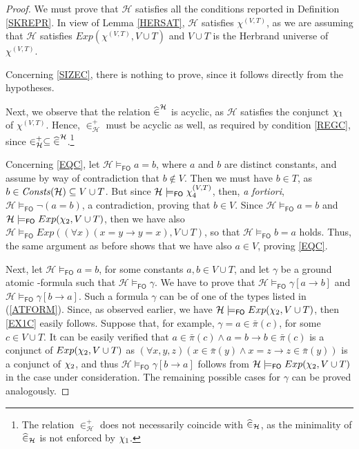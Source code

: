 \documentclass[a4paper]{llncs}
\newcommand{\HExp}{Exp}
\newcommand{\memclosure}[1]{\in_{#1}^{+}}
\newcommand{\nonpairin}[2]{#1 \in \bar{\pi}(#2)}
\newcommand{\seteq}[2]{#1=#2}
\newcommand{\consta}{a}
\newcommand{\constb}{b}
\newcommand{\constc}{c}
\newcommand{\subst}[3]{#1[#2\rightarrow#3]}
\newcommand{\hinter}{\ensuremath{\mathcal{H}}}
\newcommand{\fomodels}[2]{#1 \models_{\mathsf{FO}} #2}
\begin{document}
\begin{proof}
We must prove that $\hinter$ satisfies all the conditions
reported in Definition \ref{SKREPR}.
In view of Lemma
\ref{HERSAT},
$\hinter$ satisfies $\chi^{(V,T)}$, as we are assuming that
$\hinter$ satisfies $\HExp(\chi^{(V,T)}, V \cup T)$ and $V \cup T$ is
the Herbrand universe of $\chi^{(V,T)}$.

Concerning \ref{SIZEC}, there is nothing to prove, since it follows 
directly from the hypotheses.

Next, we observe that the relation $\memhatP^{\hinter}$ is acyclic,
as $\hinter$ satisfies the conjunct $\chi_1$ of $\chi^{(V,T)}$.
Hence, $\memclosure{\hinter}$ must be acyclic as well, as required by
condition \ref{REGC}, since $\memclosure{\hinter} \subseteq
\memhatP^{\hinter}$.\footnote{The relation $\memclosure{\hinter}$ does
not necessarily coincide with $\memhatP_{\hinter}$, as the minimality
of $\memhatP_{\hinter}$ is not enforced by $\chi_1$.}

Concerning \ref{EQC}, let 
$\fomodels{\hinter}{\seteq{\consta}{\constb}}$, where $a$ and $b$ are 
distinct constants, and assume by
way of contradiction that $\constb \notin V$. Then we must have 
$\constb \in T$, as $b \in \Consts(\hinter) \subseteq V \cup T$.
But since $\fomodels{\hinter}{\eqf}$, then, \emph{a fortiori}, 
$\fomodels{\hinter}{\neg(\seteq{\consta}{\constb})}$, a contradiction,
proving that $\constb \in V$. Since 
$\fomodels{\hinter}{\seteq{\consta}{\constb}}$ and 
$\fomodels{\hinter}{\HExp(\exonef, V \cup T)}$,
then we have also $\fomodels{\hinter}{\HExp((\forall x)(\seteq{x}{y} 
\rightarrow \seteq{y}{x}), V \cup T)}$, so
that $\fomodels{\hinter}{\seteq{\constb}{\consta}}$ holds. Thus, the 
same argument as before shows that we have also
$\consta \in V$, proving \ref{EQC}.

Next, let $\fomodels{\hinter}{\seteq{\consta}{\constb}}$, for some
constants
$\consta, \constb \in V \cup T$, and let $\gamma$ be a ground
atomic \Forallpizero-formula such that $\fomodels{\hinter}{\gamma}$. We have to prove
that $\fomodels{\hinter}{\subst{\gamma}{\consta}{\constb}}$ and
$\fomodels{\hinter}{\subst{\gamma}{\constb}{\consta}}$. Such a formula $\gamma$
can be of one of the types listed in (\ref{ATFORM}). 
Since, as observed earlier, we have 
$\fomodels{\hinter}{\HExp(\exonef, V \cup T)}$, then \ref{EX1C} easily 
follows. Suppose that, for example, $\gamma=\nonpairin{\consta}{\constc}$, 
for some $\constc \in V \cup T$. It can be easily verified that
$\nonpairin{\consta}{\constc} \wedge \seteq{\consta}{\constb} \rightarrow
\nonpairin{\constb}{\constc}$  is a conjunct of $\HExp(\exonef, V \cup T)$
as $(\forall x, y, z)(\nonpairin{x}{y} \wedge \seteq{x}{z} 
\rightarrow \nonpairin{z}{y})$ is a conjunct of $\chi_2$,
and thus $\fomodels{\hinter}{\subst{\gamma}{\constb}{\consta}}$
follows from $\fomodels{\hinter}{\HExp(\exonef, V \cup T)}$ in the case
under consideration. The
remaining possible cases for $\gamma$ can be proved analogously.


\end{proof}
\end{document}
